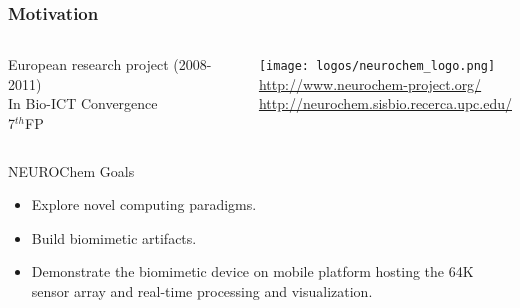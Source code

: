 \documentclass{beamer}
\begin{document}
\begin{frame}
  \frametitle{Motivation}
\begin{block}{}
     \begin{columns}
   European research project (2008-2011)\\
   In Bio-ICT Convergence\\
   7$^{th}$FP

      \texttt{[image: logos/neurochem\_logo.png]} \\
      \tiny{\href{http://www.neurochem-project.org/}{http://www.neurochem-project.org/}} \\
      \tiny{\href{http://neurochem.sisbio.recerca.upc.edu/}{http://neurochem.sisbio.recerca.upc.edu/}}
    \end{columns}
    \end{block}
 \begin{block}{NEUROChem Goals}

      \begin{itemize}
        \item Explore novel computing paradigms.
        \item Build biomimetic artifacts.

          \item  Demonstrate the biomimetic device on mobile platform 
      hosting the 64K sensor array and real-time processing and visualization.

      \end{itemize}
    \end{block}


 \end{frame}
 
\end{document}
